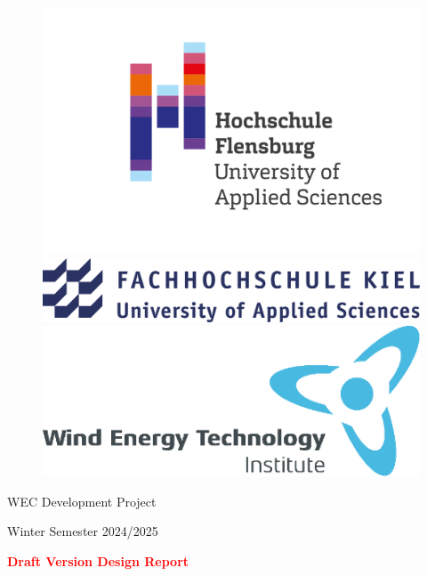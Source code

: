 \newpage
\thispagestyle{empty}
{\selectfont
	\hfuzz=20pt       %
	
	\begin{figure}[!htb]
		\includegraphics[width=\linewidth]{Figures/logos/HSFL}
		\endminipage\hfill
		\includegraphics[width=\linewidth]{Figures/logos/FHKiel}
		\endminipage\hfill
		\includegraphics[width=\linewidth]{Figures/logos/WETI}
		\endminipage
	\end{figure}
		
	
	\vspace{0.5cm}
	\begin{minipage}[b][0cm][t]{\textwidth}
		\fontsize{18pt}{18pt}
		\selectfont
		\begin{center}
			WEC Development Project
		\end{center}
		\fontsize{14pt}{14pt}
		\selectfont
		\begin{center}
			Winter Semester 2024/2025
		\end{center}
		\fontsize{18pt}{18pt}
		\selectfont
		\begin{center}
			\textbf{\textcolor{red}{Draft Version Design Report}}
		\end{center}
	\end{minipage}
	
}

